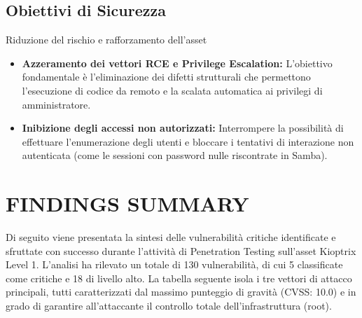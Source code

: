 \documentclass[12pt, a4paper]{article}
\begin{document}
	\subsection{Obiettivi di Sicurezza }
	Riduzione del rischio e rafforzamento dell'asset
	\begin{itemize}
		\item \textbf{Azzeramento dei vettori RCE e Privilege Escalation:} L'obiettivo fondamentale è l'eliminazione dei difetti strutturali che permettono l'esecuzione di codice da remoto e la scalata automatica ai privilegi di amministratore.
		\item \textbf{Inibizione degli accessi non autorizzati:} Interrompere la possibilità di effettuare l'enumerazione degli utenti e bloccare i tentativi di interazione non autenticata (come le sessioni con password nulle riscontrate in Samba).
	\end{itemize}















	\newpage
	\section{FINDINGS SUMMARY}

	Di seguito viene presentata la sintesi delle vulnerabilità critiche identificate e sfruttate con successo durante l'attività di Penetration Testing sull'asset Kioptrix Level 1. L'analisi ha rilevato un totale di 130 vulnerabilità, di cui 5 classificate come critiche e 18 di livello alto. 
	La tabella seguente isola i tre vettori di attacco principali, tutti caratterizzati dal massimo punteggio di gravità (CVSS: 10.0) e in grado di garantire all'attaccante il controllo totale dell'infrastruttura (root).

	\vspace{0.5cm}
\end{document}
